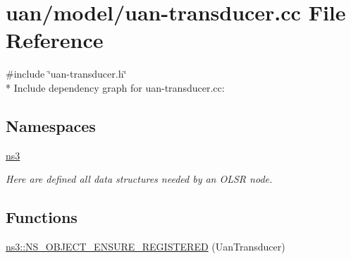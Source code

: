 \hypertarget{uan-transducer_8cc}{}\section{uan/model/uan-\/transducer.cc File Reference}
\label{uan-transducer_8cc}
{\ttfamily \#include \char`\"{}uan-\/transducer.\+h\char`\"{}}\\*
Include dependency graph for uan-\/transducer.cc\+:
\subsection*{Namespaces}
\begin{DoxyCompactItemize}
\item 
 \hyperlink{namespacens3}{ns3}
\begin{DoxyCompactList}\small\item\em Here are defined all data structures needed by an O\+L\+SR node. \end{DoxyCompactList}\end{DoxyCompactItemize}
\subsection*{Functions}
\begin{DoxyCompactItemize}
\item 
\hyperlink{namespacens3_abfc05004eea7fc10ba6e1735e96dc442}{ns3\+::\+N\+S\+\_\+\+O\+B\+J\+E\+C\+T\+\_\+\+E\+N\+S\+U\+R\+E\+\_\+\+R\+E\+G\+I\+S\+T\+E\+R\+ED} (Uan\+Transducer)
\end{DoxyCompactItemize}

